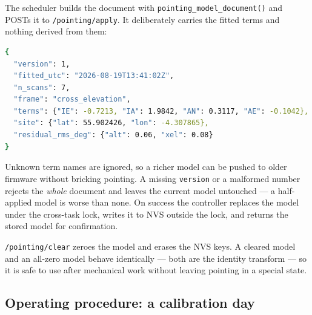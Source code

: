 \documentclass[11pt,a4paper]{article}
\begin{document}
The scheduler builds the document with \texttt{pointing\_model\_document()} and POSTs it to \texttt{/pointing/apply}. It deliberately carries the fitted terms and nothing derived from them:

\begin{lstlisting}[language=bash,caption={Pointing model document}]
{
  "version": 1,
  "fitted_utc": "2026-08-19T13:41:02Z",
  "n_scans": 7,
  "frame": "cross_elevation",
  "terms": {"IE": -0.7213, "IA": 1.9842, "AN": 0.3117, "AE": -0.1042},
  "site": {"lat": 55.902426, "lon": -4.307865},
  "residual_rms_deg": {"alt": 0.06, "xel": 0.08}
}
\end{lstlisting}

Unknown term names are ignored, so a richer model can be pushed to older firmware without bricking pointing. A missing \texttt{version} or a malformed number rejects the \emph{whole} document and leaves the current model untouched --- a half-applied model is worse than none. On success the controller replaces the model under the cross-task lock, writes it to NVS outside the lock, and returns the stored model for confirmation.

\texttt{/pointing/clear} zeroes the model and erases the NVS keys. A cleared model and an all-zero model behave identically --- both are the identity transform --- so it is safe to use after mechanical work without leaving pointing in a special state.

\subsection{Operating procedure: a calibration day}
\label{sec:calday}
\end{document}
